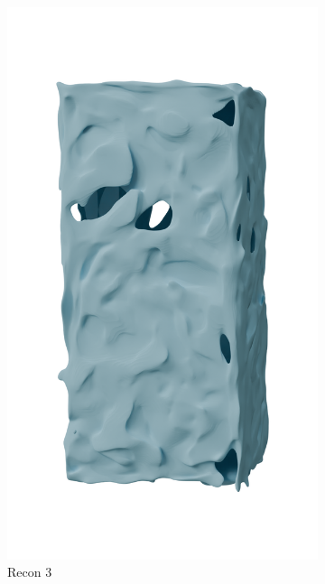\begin{figure}[htb]
\begin{subfigure}{0.19\textwidth}
            \includegraphics[width=\linewidth]{figures/inr_cabinet/cabi_inr9.png}
            \caption{Recon 3}
        \end{subfigure}
        \hfill
        \begin{subfigure}{0.19\textwidth}

\end{subfigure}
\end{figure}
